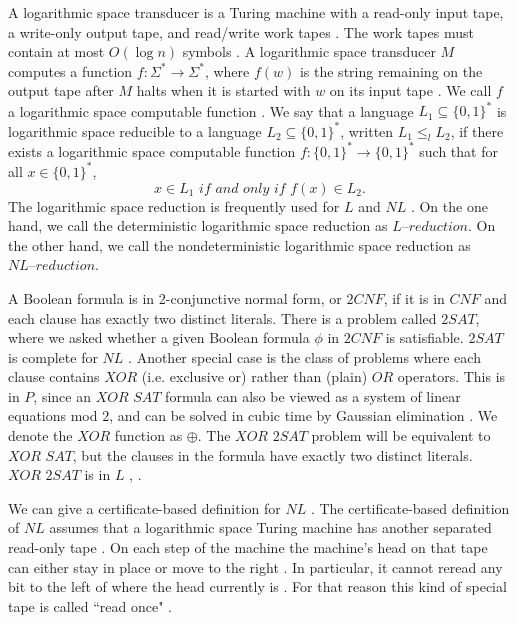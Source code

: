 \documentclass[a4paper,UKenglish,cleveref, autoref]{lipics-v2019}
\begin{document}
A logarithmic space transducer is a Turing machine with a read-only input tape, a write-only output tape, and read/write work tapes \cite{MS06}. The work tapes must contain at most $O(\log n)$ symbols \cite{MS06}. A logarithmic space transducer $M$ computes a function $f : \Sigma^{*} \rightarrow \Sigma^{*}$, where $f(w)$ is the string remaining on the output tape after $M$ halts when it is started with $w$ on its input tape \cite{MS06}. We call $f$ a logarithmic space computable function \cite{MS06}. We say that a language $L_{1} \subseteq \{0, 1\}^{*}$ is logarithmic space reducible to a language $L_{2} \subseteq \{0, 1\}^{*}$, written $L_{1} \leq_{l} L_{2}$, if there exists a logarithmic space computable function $f : \{0, 1\}^{*} \rightarrow \{0, 1\}^{*}$ such that for all $x \in \{0, 1\}^{*}$,
\[x \in L_{1} \textit{ if and only if } f(x) \in L_{2}.\]
The logarithmic space reduction is frequently used for $L$ and $NL$ \cite{Pap03}. On the one hand, we call the deterministic logarithmic space reduction as $\textit{L--reduction}$. On the other hand, we call the nondeterministic logarithmic space reduction as $\textit{NL--reduction}$.

A Boolean formula is in 2-conjunctive normal form, or $2CNF$, if it is in $CNF$ and each clause has exactly two distinct literals. There is a problem called $2SAT$, where we asked whether a given Boolean formula $\phi$ in $2CNF$ is satisfiable. $2SAT$ is complete for $NL$ \cite{Pap03}. Another special case is the class of problems where each clause contains $XOR$ (i.e. exclusive or) rather than (plain) $OR$ operators. This is in $P$, since an $\textit{XOR SAT}$ formula can also be viewed as a system of linear equations mod $2$, and can be solved in cubic time by Gaussian elimination \cite{MM11}. We denote the $XOR$ function as $\oplus$. The $\textit{XOR 2SAT}$ problem will be equivalent to $\textit{XOR SAT}$, but the clauses in the formula have exactly two distinct literals. $\textit{XOR 2SAT}$ is in $L$ \cite{AR00}, \cite{RM08}.

We can give a certificate-based definition for $NL$ \cite{AB09}. The certificate-based definition of $NL$ assumes that a logarithmic space Turing machine has another separated read-only tape \cite{AB09}. On each step of the machine the machine's head on that tape can either stay in place or move to the right \cite{AB09}. In particular, it cannot reread any bit to the left of where the head currently is \cite{AB09}. For that reason this kind of special tape is called ``read once" \cite{AB09}.
\end{document}
